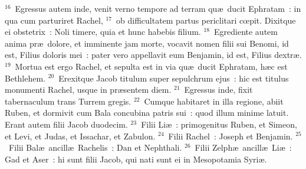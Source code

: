 ${}^{16}$~Egressus autem inde, venit verno tempore ad terram qu\ae\ ducit Ephratam~: in qua cum parturiret Rachel,
${}^{17}$~ob difficultatem partus periclitari cœpit. Dixitque ei obstetrix~: Noli timere, quia et hunc habebis filium.
${}^{18}$~Egrediente autem anima pr\ae\ dolore, et imminente jam morte, vocavit nomen filii sui Benomi, id est, Filius doloris mei~: pater vero appellavit eum Benjamin, id est, Filius dextr\ae .
${}^{19}$~Mortua est ergo Rachel, et sepulta est in via qu\ae\ ducit Ephratam, h\ae c est Bethlehem.
${}^{20}$~Erexitque Jacob titulum super sepulchrum ejus~: hic est titulus monumenti Rachel, usque in pr\ae sentem diem.
${}^{21}$~Egressus inde, fixit tabernaculum trans Turrem gregis.
${}^{22}$~Cumque habitaret in illa regione, abiit Ruben, et dormivit cum Bala concubina patris sui~: quod illum minime latuit. Erant autem filii Jacob duodecim.
${}^{23}$~Filii Li\ae~: primogenitus Ruben, et Simeon, et Levi, et Judas, et Issachar, et Zabulon.
${}^{24}$~Filii Rachel~: Joseph et Benjamin.
${}^{25}$~Filii Bal\ae\ ancill\ae\ Rachelis~: Dan et Nephthali.
${}^{26}$~Filii Zelph\ae\ ancill\ae\ Li\ae~: Gad et Aser~: hi sunt filii Jacob, qui nati sunt ei in Mesopotamia Syri\ae .


